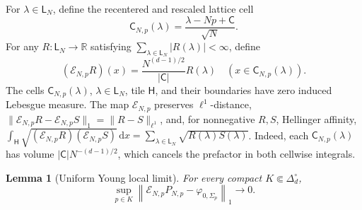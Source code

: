 \documentclass[11pt]{article}
\newtheorem{lemma}[lemma]{Lemma}
\theoremstyle{remark}
\theoremstyle{plain}
\newcommand{\R}{\mathbb R}
\newcommand{\dd}{\mathrm d}
\begin{document}
For \(\lambda\in\mathsf L_N\), define the recentered and
rescaled lattice cell
\[
  \mathsf C_{N,p}(\lambda)=\frac{\lambda-Np+\mathsf C}{\sqrt N}.
\]
For any \(R:\mathsf L_N\to\R\) satisfying
\(\sum_{\lambda\in\mathsf L_N}|R(\lambda)|<\infty\), define
\[
  (\mathcal E_{N,p}R)(x)
  =\frac{N^{(d-1)/2}}{|\mathsf C|}R(\lambda)
  \quad(x\in\mathsf C_{N,p}(\lambda)).
\]
The cells \(\mathsf C_{N,p}(\lambda)\), \(\lambda\in\mathsf L_N\),
tile \(\mathsf H\), and their boundaries have zero induced Lebesgue measure.
The map \(\mathcal E_{N,p}\) preserves \(\ell^1\)-distance,
\(\|\mathcal E_{N,p}R-\mathcal E_{N,p}S\|_1=\|R-S\|_{\ell^1}\), and, for
nonnegative \(R,S\), Hellinger affinity,
\(\int_{\mathsf H}\sqrt{(\mathcal E_{N,p}R)(\mathcal E_{N,p}S)}\,\dd x
=\sum_{\lambda\in\mathsf L_N}\sqrt{R(\lambda)S(\lambda)}\).
Indeed, each \(\mathsf C_{N,p}(\lambda)\) has volume
\(|\mathsf C|N^{-(d-1)/2}\), which cancels the prefactor in both cellwise
integrals.

\begin{lemma}[Uniform Young local limit]\label{lem:young-local-limit}
For every compact \(K\Subset\Delta_d^\circ\),
\begin{equation}\label{eq:young-local-limit}
  \sup_{p\in K}
  \left\|\mathcal E_{N,p}P_{N,p}-\varphi_{0,\Sigma_p}\right\|_1
  \longrightarrow0.
\end{equation}
\end{lemma}
\end{document}
